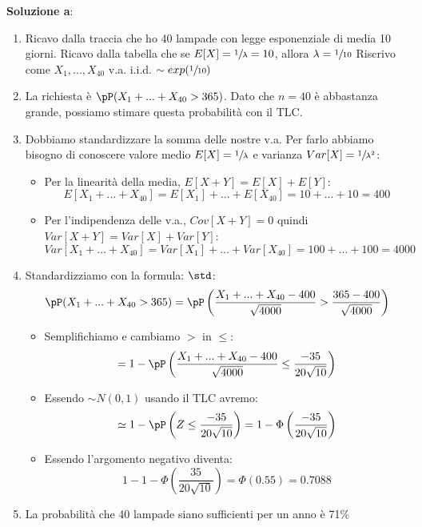 \ind \textbf{Soluzione a}: 
\begin{enumerate}
    \item Ricavo dalla traccia che ho 40 lampade con legge esponenziale di media 10 giorni. Ricavo dalla tabella che se $E[X]=\sfrac{1}{\lambda}=10$, allora $\lambda=\sfrac{1}{10}$ Riscrivo come $X_1, ..., X_{40}$ v.a. i.i.d. $\sim exp(\sfrac{1}{10})$
    \item La richiesta è $\pP (X_1 + ... + X_{40} > 365)$. Dato che $n=40$ è abbastanza grande, possiamo stimare questa probabilità con il TLC.
    \item Dobbiamo standardizzare la somma delle nostre v.a. Per farlo abbiamo bisogno di conoscere valore medio $E[X] = \sfrac{1}{\lambda}$ e varianza $Var[X] = \sfrac{1}{\lambda^2}$: 
        \begin{itemize}
            \item Per la linearità della media, $E[X+Y] = E[X] + E[Y]$: $$E[X_1 + ... + X_{40}] = E[X_1] + ... + E[X_{40}] = 10 + ... + 10 = 400$$
            \item Per l'indipendenza delle v.a., $Cov[X+Y]=0$ quindi $Var[X+Y]= Var[X] + Var[Y]$: $$Var[X_1 + ... + X_{40}] = Var[X_1] + ... + Var[X_{40}] = 100 + ... + 100 = 4000$$
        \end{itemize}
    \item Standardizziamo con la formula: $\std$: $$\pP (X_1 + ... + X_{40} > 365) = \pP \left( \dfrac{X_1 + ... + X_{40} - 400}{\sqrt{4000}} > \dfrac{365 - 400}{\sqrt{4000}} \right) $$
        \begin{itemize}
            \item Semplifichiamo e cambiamo $>$ in $\leq$: $$= 1 - \pP \left( \dfrac{X_1 + ... + X_{40} - 400}{\sqrt{4000}} \leq \dfrac{-35}{20\sqrt{10}} \right)$$
            \item Essendo $\sim N(0,1)$ usando il TLC avremo: $$\simeq 1 - \pP \left(Z \leq  \dfrac{-35}{20\sqrt{10}} \right) = 1 -\Phi \left( \dfrac{-35}{20\sqrt{10}} \right)$$  
            \item Essendo l'argomento negativo diventa: $$1 - 1 - \Phi \left( \dfrac{35}{20\sqrt{10}} \right) = \Phi(0.55) = 0.7088$$
        \end{itemize}
    \item La probabilità che 40 lampade siano sufficienti per un anno è 71\%
\end{enumerate}

